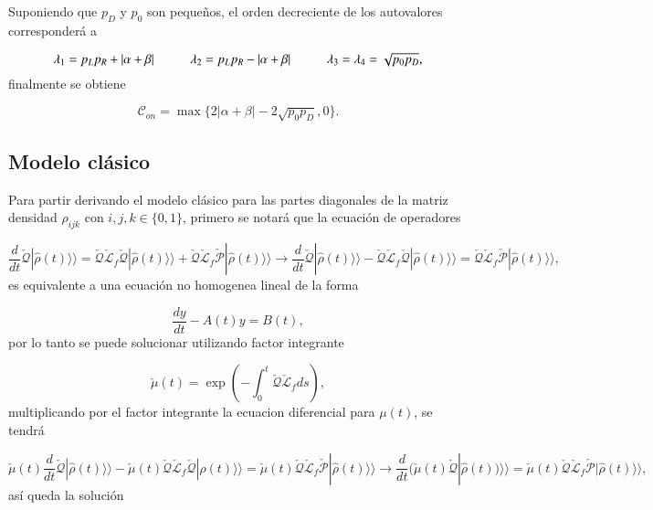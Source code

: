 \begin{appendixs}
Suponiendo que $p_{D}$ y $p_{0}$ son pequeños, el orden decreciente de los autovalores corresponderá a

\begin{equation*}
    \lambda_{1} = p_{L}p_{R} + |\alpha + \beta| \hspace{10mm}  \lambda_{2} = p_{L}p_{R} - |\alpha + \beta| \hspace{10mm} \lambda_{3}=\lambda_{4} = \sqrt{p_{0}p_{D}},
\end{equation*}
finalmente se obtiene

\begin{equation*}
    \mathcal{C}_{on} = \max\{ 2|\alpha+\beta| - 2\sqrt{p_{0}p_{D}},0\}.
\end{equation*}

\label{appendix5final}

\subsection{Modelo clásico}
Para partir derivando el modelo clásico para las partes diagonales de la matriz densidad $\rho_{ijk}$ con $i,j,k \in \{0,1\}$, primero se notará que la ecuación de operadores

\begin{equation*}
    \frac{d}{dt}\check{\mathcal{Q}}|\hat{\rho}(t)\rangle \rangle = \check{\mathcal{Q}}\check{\mathcal{L}}_{f}\check{\mathcal{Q}}|\hat{\rho}(t)\rangle \rangle + \check{\mathcal{Q}}\check{\mathcal{L}}_{f}\check{\mathcal{P}}|\hat{\rho}(t)\rangle \rangle \to \frac{d}{dt}\check{\mathcal{Q}}|\hat{\rho}(t)\rangle \rangle - \check{\mathcal{Q}}\check{\mathcal{L}}_{f}\check{\mathcal{Q}}|\hat{\rho}(t)\rangle \rangle = \check{\mathcal{Q}}\check{\mathcal{L}}_{f}\check{\mathcal{P}}|\hat{\rho}(t)\rangle \rangle ,
\end{equation*}
es equivalente a una ecuación no homogenea lineal de la forma

\begin{equation*}
    \frac{dy}{dt} - A(t)y = B(t),
\end{equation*}
por lo tanto se puede solucionar utilizando factor integrante

\begin{equation*}
    \check{\mu}(t) = \exp\left( - \int_{0}^{t}\check{\mathcal{Q}}\check{\mathcal{L}}_{f}ds \right),
\end{equation*}
multiplicando por el factor integrante la ecuacion diferencial para $\mu(t)$, se tendrá

\begin{equation*}
    \check{\mu}(t)\frac{d}{dt}\check{\mathcal{Q}}|\hat{\rho}(t)\rangle \rangle - \check{\mu}(t)\check{\mathcal{Q}}\check{\mathcal{L}}_{f}\check{\mathcal{Q}}|\hat{\rho}(t)\rangle \rangle  = \check{\mu}(t)\check{\mathcal{Q}}\check{\mathcal{L}}_{f}\check{\mathcal{P}}|\hat{\rho}(t)\rangle \rangle  \to \frac{d}{dt}(\check{\mu}(t)\check{\mathcal{Q}}|\hat{\rho}(t))\rangle \rangle = \check{\mu}(t)\check{\mathcal{Q}}\check{\mathcal{L}}_{f}\check{\mathcal{P}}|\hat{\rho}(t)\rangle \rangle ,
\end{equation*}
así queda la solución


\end{appendixs}
